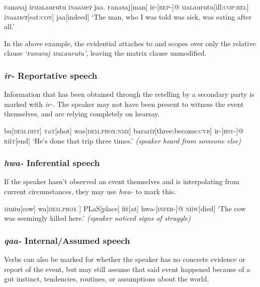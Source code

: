 \documentclass[a4paper,10pt,twoside,openright]{memoir}
\newcommand{\lilglot}{ɂ}
\newcommand{\famwordold}[5]{#1\textsc{#2}#3\textsc{#4}#5}
\begin{document}
\ex
\begingl
\glpreamble \famwordold{}{f}{ana}{s}{aj} \famwordold{ir}{m}{a}{l}{aurutu} \famwordold{i}{n}{aa}{m}{e\lilglot} jaa.
\endpreamble
\famwordold{}{f}{ana}{s}{aj}[man]
ir-[\textsc{rep-}]@
\famwordold{}{m}{a}{l}{aurutu}[ill:\textsc{cop:rel}]
\famwordold{i}{n}{aa}{m}{e\lilglot}[eat:\textsc{con}]
jaa[indeed]
\glft `The man, who I was told was sick, was eating after all.'
\endgl
\xe

In the above example, the evidential attaches to and scopes over only the relative clause \emph{`\famwordold{}{f}{ana}{s}{aj} \famwordold{}{m}{a}{l}{aurutu}'}, leaving the matrix clause unmodified. 

\subsubsection{\emph{ir-} Reportative speech}

Information that has been obtained through the retelling by a secondary party is marked with \emph{ir-}. The speaker may not have been present to witness the event themselves, and are relying completely on hearsay.

\ex
\begingl
bu[\textsc{dem.dist}]
\famwordold{}{y}{a}{t}{}[shot]
was[\textsc{dem.prox:nmz}]
barari\lilglot[three:become:\textsc{cvb}]
ir-[\textsc{hsy-}]@
\famwordold{}{r}{ii}{t}{}[end]
\glft `He's done that trip three times.' \textit{(speaker heard from someone else)}
\endgl
\xe

\subsubsection{\emph{hwa-} Inferential speech}

If the speaker hasn't observed an event themselves and is interpolating from current circumstances, they may use \emph{hwa-} to mark this. 

\ex
\begingl
\famwordold{}{m}{u}{h}{u}[cow]
wa[\textsc{dem.prox
}]
\famwordold{}{PL}{a}{S}{}[place]
fit[at]
hwa-[\textsc{infer-}]@
\famwordold{}{n}{ii}{w}{}[died]
\glft `The cow was seemingly killed here.' \textit{(speaker noticed signs of struggle)}
\endgl
\xe

\subsubsection{\emph{qaa-} Internal/Assumed speech}

Verbs can also be marked for whether the speaker has no concrete evidence or report of the event, but may still assume that said event happened because of a gut instinct, tendencies, routines, or assumptions about the world.
\end{document}
